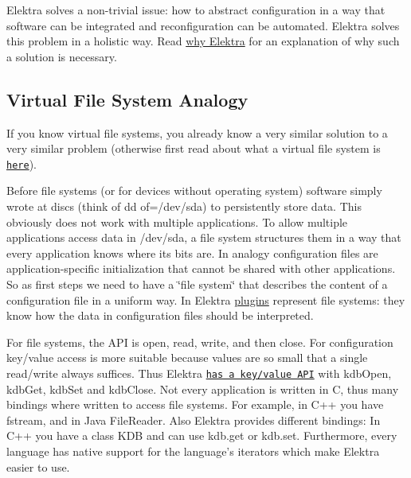 Elektra solves a non-\/trivial issue\+: how to abstract configuration in a way that software can be integrated and reconfiguration can be automated. Elektra solves this problem in a holistic way. Read \hyperlink{doc_WHY_md}{why Elektra} for an explanation of why such a solution is necessary.

\subsection*{Virtual File System Analogy}

If you know virtual file systems, you already know a very similar solution to a very similar problem (otherwise first read about what a virtual file system is \href{https://en.wikipedia.org/wiki/Virtual_file_system}{\tt here}).

Before file systems (or for devices without operating system) software simply wrote at discs (think of {\ttfamily dd of=/dev/sda}) to persistently store data. This obviously does not work with multiple applications. To allow multiple applications access data in {\ttfamily /dev/sda}, a file system structures them in a way that every application knows where its bits are. In analogy configuration files are application-\/specific initialization that cannot be shared with other applications. So as first steps we need to have a \char`\"{}file system\char`\"{} that describes the content of a configuration file in a uniform way. In Elektra \hyperlink{md_src_plugins_README_src_plugins_README_md}{plugins} represent file systems\+: they know how the data in configuration files should be interpreted.

For file systems, the A\+P\+I is {\ttfamily open}, {\ttfamily read}, {\ttfamily write}, and then {\ttfamily close}. For configuration key/value access is more suitable because values are so small that a single read/write always suffices. Thus Elektra \href{http://doc.libelektra.org/api/current/html}{\tt has a key/value A\+P\+I} with {\ttfamily kdb\+Open}, {\ttfamily kdb\+Get}, {\ttfamily kdb\+Set} and {\ttfamily kdb\+Close}. Not every application is written in C, thus many {\ttfamily bindings} where written to access file systems. For example, in C++ you have {\ttfamily fstream}, and in Java {\ttfamily File\+Reader}. Also Elektra provides different bindings\+: In C++ you have a class {\ttfamily K\+D\+B} and can use {\ttfamily kdb.\+get} or {\ttfamily kdb.\+set}. Furthermore, every language has native support for the language's iterators which make Elektra easier to use.

